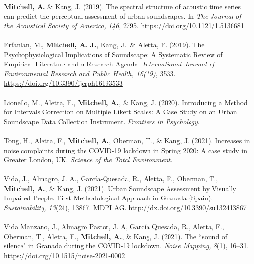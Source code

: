 \documentclass[twoside,fontsize=12pt,titlepage,chapterprefix=true
]{scrbook}
\begin{document}
\paragraph*{}
\textbf{Mitchell, A.} \& Kang, J. (2019). The spectral structure of acoustic time series can predict the perceptual assessment of urban soundscapes. In \emph{The Journal of the Acoustical Society of America, 146}, 2795. \url{https://doi.org/10.1121/1.5136681}

\paragraph*{}
Erfanian, M., \textbf{Mitchell, A. J.}, Kang, J., \& Aletta, F. (2019). The Psychophysiological Implications of Soundscape: A Systematic Review of Empirical Literature and a Research Agenda. \emph{International Journal of Environmental Research and Public Health, 16(19)}, 3533. \url{https://doi.org/10.3390/ijerph16193533}

\paragraph*{}
Lionello, M., Aletta, F., \textbf{Mitchell, A.}, \& Kang, J. (2020). Introducing a Method for Intervals Correction on Multiple Likert Scales: A Case Study on an Urban Soundscape Data Collection Instrument. \emph{Frontiers in Psychology}.

\paragraph*{}Tong, H., Aletta, F., \textbf{Mitchell, A.}, Oberman, T., \& Kang, J. (2021). Increases in noise complaints during the COVID-19 lockdown in Spring 2020: A case study in Greater London, UK. \emph{Science of the Total Environment}.

\paragraph*{}
Vida, J., Almagro, J. A., García-Quesada, R., Aletta, F., Oberman, T., \textbf{Mitchell, A.}, \& Kang, J. (2021). Urban Soundscape Assessment by Visually Impaired People: First Methodological Approach in Granada (Spain). \emph{Sustainability, 13}(24), 13867. MDPI AG. \url{http://dx.doi.org/10.3390/su132413867}

\paragraph*{}
Vida Manzano, J., Almagro Pastor, J. A, Garc\'ia Quesada, R., Aletta, F., Oberman, T., Aletta, F., \textbf{Mitchell, A.}, \& Kang, J. (2021). The ``sound of silence" in Granada during the COVID-19 lockdown. \emph{Noise Mapping, 8}(1), 16--31. \url{https://doi.org/10.1515/noise-2021-0002}
\end{document}
